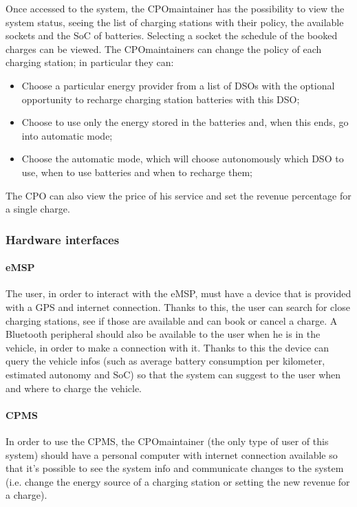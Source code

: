 Once accessed to the system, the \ac{CPO}maintainer has the possibility to view the system status, seeing the list of charging stations with their policy, the available sockets and the \ac{SoC} of batteries. Selecting a socket the schedule of the booked charges can be viewed.
The \ac{CPO}maintainers can change the policy of each charging station; in particular they can:
\begin{itemize}
    \item Choose a particular energy provider from a list of \acp{DSO} with the optional opportunity to recharge charging station batteries with this \ac{DSO};
    \item Choose to use only the energy stored in the batteries and, when this ends, go into automatic mode;
    \item Choose the automatic mode, which will choose autonomously which \ac{DSO} to use, when to use batteries and when to recharge them;
\end{itemize}

The \ac{CPO} can also view the price of his service and set the revenue percentage for a single charge.

\subsubsection{Hardware interfaces}
\paragraph{\ac{eMSP}}
The user, in order to interact with the \ac{eMSP}, must have a device that is provided with a \ac{GPS} and internet connection. Thanks to this, the user can search for close charging stations, see if those are available and can book or cancel a charge.
A Bluetooth peripheral should also be available to the user when he is in the vehicle, in order to make a connection with it. Thanks to this the device can query the vehicle infos (such as average battery consumption per kilometer, estimated autonomy and \ac{SoC}) so that the system can suggest to the user when and where to charge the vehicle.

\paragraph{\ac{CPMS}}
In order to use the \ac{CPMS}, the \ac{CPO}maintainer (the only type of user of this system) should have a personal computer with internet connection available so that it's possible to see the system info and communicate changes to the system (i.e. change the energy source of a charging station or setting the new revenue for a charge).

